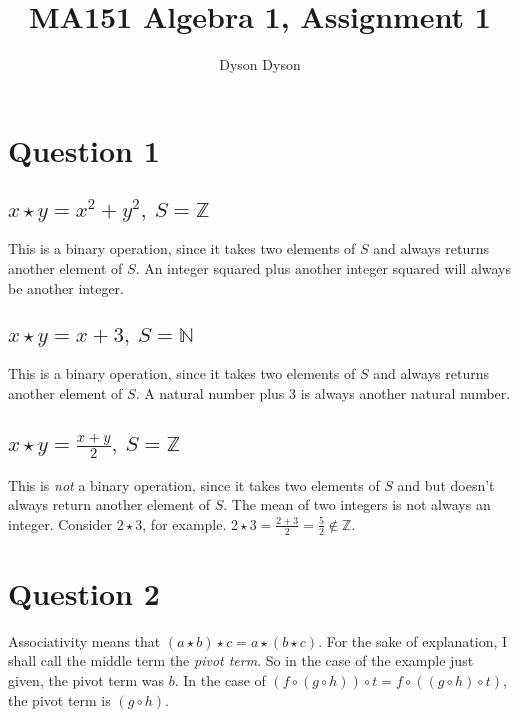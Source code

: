 \documentclass[a4paper]{article}
\title{MA151 Algebra 1, Assignment 1}
\author{Dyson Dyson}
\date{}
\begin{document}
\maketitle

\setlength{\parindent}{0em}
\setlength{\parskip}{1em}


\section*{Question 1}
\setcounter{section}{1}
\setcounter{subsection}{0}

\subsection{$x \star y = x^2 + y^2,\ S = \mathbb Z$}

This is a binary operation, since it takes two elements of $S$ and always returns another element of $S$. An integer squared plus another integer squared will always be another integer.

\subsection{$x \star y = x + 3,\ S = \mathbb N$}

This is a binary operation, since it takes two elements of $S$ and always returns another element of $S$. A natural number plus 3 is always another natural number.

\subsection{$x \star y = \frac{x + y}{2},\ S = \mathbb Z$}

This is \textit{not} a binary operation, since it takes two elements of $S$ and but doesn't always return another element of $S$. The mean of two integers is not always an integer. Consider $2 \star 3$, for example. $2 \star 3 = \frac{2 + 3}{2} = \frac52 \notin \mathbb Z$.


\section*{Question 2}

Associativity means that $(a \star b) \star c = a \star (b \star c)$. For the sake of explanation, I shall call the middle term the \textit{pivot term}. So in the case of the example just given, the pivot term was $b$. In the case of $(f \circ (g \circ h)) \circ t = f \circ ((g \circ h) \circ t)$, the pivot term is $(g \circ h)$.
\end{document}
